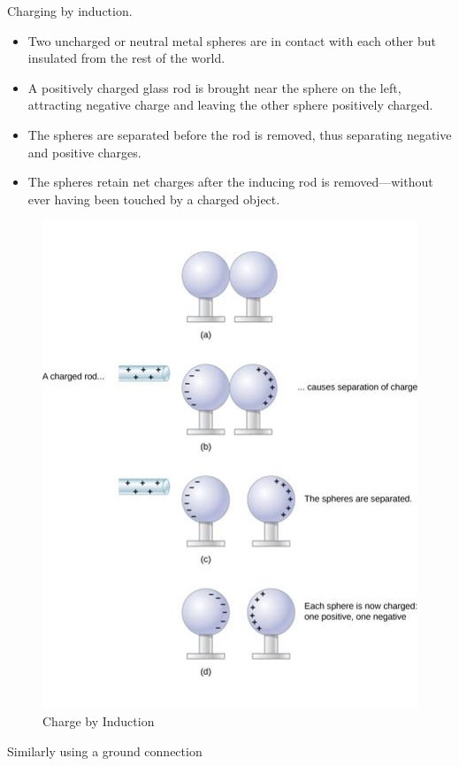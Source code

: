 \documentclass[14pt]{memoir}
\begin{document}
Charging by induction.
\begin{itemize}
\item Two uncharged or neutral metal spheres are in contact with each other but insulated from the rest of the world.
\item A positively charged glass rod is brought near the sphere on the left, attracting negative charge and leaving the other sphere positively charged.
\item The spheres are separated before the rod is removed, thus separating negative and positive charges.
\item The spheres retain net charges after the inducing rod is removed—without ever having been touched by a charged object.
\end{itemize}

\begin{figure}[h]
\begin{center}
\includegraphics[scale=0.60]{fig/fig_05_12.jpg}
\caption{Charge by Induction}
\label{fig:05_12}
\end{center}
\end{figure}

Similarly using a ground connection
\end{document}
